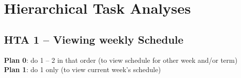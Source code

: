 \documentclass[12pt]{article}
\begin{document}
\newpage
\section{Hierarchical Task Analyses}\vspace{3mm}
\subsection{HTA 1 -- Viewing weekly Schedule}
\vspace{4mm}
\begin{center}
\end{center}

\textbf{Plan 0}: do 1 -- 2 in that order (to view schedule for other week and/or term)\\

\textbf{Plan 1}: do 1 only (to view current week's schedule)
\end{document}
